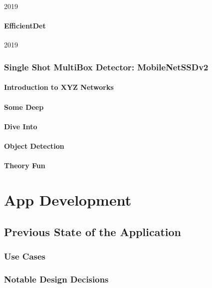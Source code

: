 \documentclass[
			   fontsize=11pt,
               paper=a4,
               bibliography=totoc,
               idxtotoc,
               headsepline,
               footsepline,
               footinclude=false,
               BCOR=12mm,
               DIV=13,
               openany,   %
               ]
               {scrbook}
\begin{document}
2019

\subsubsection{EfficientDet}

2019


\subsection{Single Shot MultiBox Detector: MobileNetSSDv2}

\subsubsection{Introduction to XYZ Networks}


\subsubsection{Some Deep}
\subsubsection{Dive Into}
\subsubsection{Object Detection}
\subsubsection{Theory Fun}

\chapter{App Development}

\section{Previous State of the Application}

\subsection{Use Cases}

\subsection{Notable Design Decisions}
\end{document}
